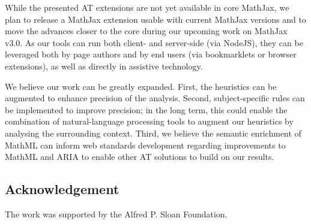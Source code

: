 \documentclass[conference]{IEEEtran}
\begin{document}
While the presented AT extensions are not yet available in core MathJax, we plan
to release a MathJax extension usable with current MathJax versions and to move
the advances closer to the core during our upcoming work on MathJax v3.0.
As our tools can run both client- and server-side (via NodeJS), they can
be leveraged both by page authors and by end users (via bookmarklets or
browser extensions), as well as directly in assistive technology.

We believe our work can be greatly expanded. First, the heuristics can be
augmented to enhance precision of the analysis. Second, subject-specific rules
can be implemented to improve precision; in the long term, this could enable the
combination of natural-language processing tools to augment our heuristics by
analysing the surrounding context. Third, we believe the semantic enrichment of
MathML can inform web standards development regarding improvements to MathML and
ARIA to enable other AT solutions to build on our results.

\subsection*{Acknowledgement}
\noindent The work was supported by the Alfred P. Sloan Foundation.
\end{document}
